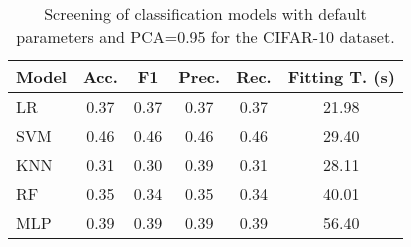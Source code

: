 \begin{table}
    \centering
    \caption{Screening of classification models with default parameters and PCA=0.95 for the CIFAR-10 dataset.}
    \label{tab:CIFAR_screening}
    \begin{tabular}{|l|c|c|c|c|c|}
    \toprule
    Model & Acc. & F1 & Prec. & Rec. & Fitting T. (s) \\
    \midrule
    LR & 0.37 & 0.37 & 0.37 & 0.37 & 21.98 \\
    SVM & 0.46 & 0.46 & 0.46 & 0.46 & 29.40 \\
    KNN & 0.31 & 0.30 & 0.39 & 0.31 & 28.11 \\
    RF & 0.35 & 0.34 & 0.35 & 0.34 & 40.01 \\
    MLP & 0.39 & 0.39 & 0.39 & 0.39 & 56.40 \\
    \bottomrule
    \end{tabular}
\end{table}